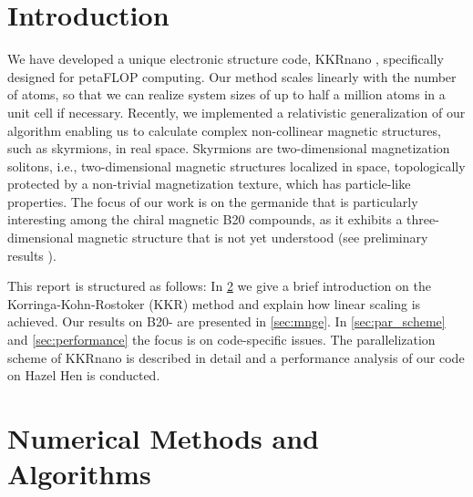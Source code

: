 \documentclass[graybox]{svmult}
\begin{document}
\section{Introduction}
\label{sec:intro}
We have developed a unique electronic structure code, 
KKRnano \cite{zeller_towards_2008,thiess_massively_2012,bornemann_large-scale_nodate},
specifically designed for petaFLOP computing. Our method scales linearly
with the number of atoms, so that we can realize system sizes of up to 
half a million atoms in a unit cell if necessary.
Recently, we implemented a relativistic generalization of our algorithm 
enabling us to calculate complex non-collinear magnetic structures, such as skyrmions,
in real space. Skyrmions are two-dimensional magnetization solitons, i.e., two-dimensional
magnetic structures localized in space, topologically protected by a non-trivial
magnetization texture, which has particle-like properties. 
The focus of our work is on the germanide  that is particularly
interesting among the chiral magnetic B20 compounds, as it exhibits a three-dimensional magnetic structure
that is not yet understood (see preliminary results
\cite{tanigaki_real-space_2015,rybakov_new_2016,bornemann_investigation_2017,bornemann_large-scale_2018}).

This report is structured as follows:
In \cref{sec:methods_algorithms} we give a brief introduction on the Korringa-Kohn-Rostoker (KKR) 
method and explain how
linear scaling is achieved.
Our results on B20- are presented in \cref{sec:mnge}.
In \cref{sec:par_scheme} and \cref{sec:performance} the focus is on code-specific issues. 
The parallelization scheme of KKRnano
is described in detail and a performance analysis of our code on Hazel Hen is conducted.


\section{Numerical Methods and Algorithms}
\label{sec:methods_algorithms}
 
\end{document}
